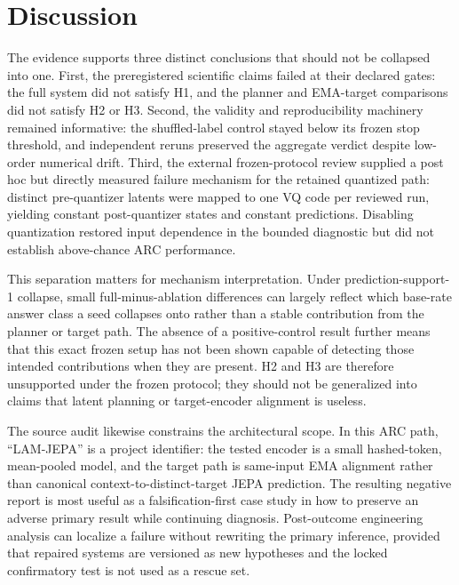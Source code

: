\documentclass[twoside]{article}
\begin{document}
\section{Discussion}
The evidence supports three distinct conclusions that should not be collapsed into one. First, the preregistered scientific claims failed at their declared gates: the full system did not satisfy H1, and the planner and EMA-target comparisons did not satisfy H2 or H3. Second, the validity and reproducibility machinery remained informative: the shuffled-label control stayed below its frozen stop threshold, and independent reruns preserved the aggregate verdict despite low-order numerical drift. Third, the external frozen-protocol review supplied a post hoc but directly measured failure mechanism for the retained quantized path: distinct pre-quantizer latents were mapped to one VQ code per reviewed run, yielding constant post-quantizer states and constant predictions. Disabling quantization restored input dependence in the bounded diagnostic but did not establish above-chance ARC performance.

This separation matters for mechanism interpretation. Under prediction-support-1 collapse, small full-minus-ablation differences can largely reflect which base-rate answer class a seed collapses onto rather than a stable contribution from the planner or target path. The absence of a positive-control result further means that this exact frozen setup has not been shown capable of detecting those intended contributions when they are present. H2 and H3 are therefore unsupported under the frozen protocol; they should not be generalized into claims that latent planning or target-encoder alignment is useless.

The source audit likewise constrains the architectural scope. In this ARC path, ``LAM-JEPA'' is a project identifier: the tested encoder is a small hashed-token, mean-pooled model, and the target path is same-input EMA alignment rather than canonical context-to-distinct-target JEPA prediction. The resulting negative report is most useful as a falsification-first case study in how to preserve an adverse primary result while continuing diagnosis. Post-outcome engineering analysis can localize a failure without rewriting the primary inference, provided that repaired systems are versioned as new hypotheses and the locked confirmatory test is not used as a rescue set.
\end{document}
